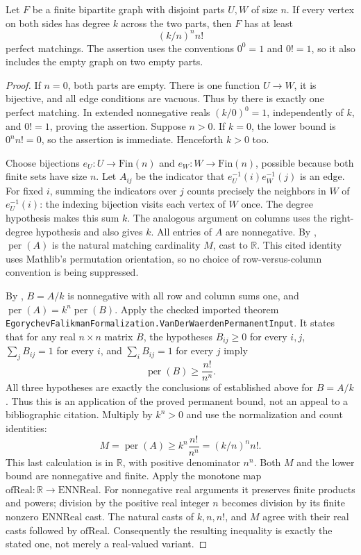 \begin{lemma}
Let $F$ be a finite bipartite graph with disjoint parts $U,W$ of size $n$.
If every vertex on both sides has degree $k$ across the two parts, then $F$
has at least
\[
 (k/n)^n n!
\]
perfect matchings.  The assertion uses the conventions $0^0=1$ and
$0!=1$, so it also includes the empty graph on two empty parts.
\end{lemma}
\begin{proof}
If $n=0$, both parts are empty. There is one function $U\to W$,
it is bijective, and all edge conditions are vacuous. Thus by
 there is exactly one perfect matching.
In extended nonnegative reals $(k/0)^0=1$, independently of $k$,
and $0!=1$, proving the assertion. Suppose $n>0$.
If $k=0$, the lower bound is $0^n n!=0$, so the assertion is immediate.
Henceforth $k>0$ too.

Choose bijections $e_U:U\to\mathrm{Fin}(n)$ and
$e_W:W\to\mathrm{Fin}(n)$, possible because both finite sets have size $n$.
Let $A_{ij}$ be the indicator that $e_U^{-1}(i)e_W^{-1}(j)$ is an edge.
For fixed $i$, summing the indicators over $j$ counts precisely the
neighbors in $W$ of $e_U^{-1}(i)$: the indexing bijection visits each vertex
of $W$ once. The degree hypothesis makes this sum $k$. The analogous
argument on columns uses the right-degree hypothesis and also gives $k$.
All entries of $A$ are nonnegative. By
, $\operatorname{per}(A)$ is
the natural matching cardinality $M$, cast to $\mathbb R$.
This cited identity uses Mathlib's permutation orientation, so no choice
of row-versus-column convention is being suppressed.

By , $B=A/k$ is nonnegative with
all row and column sums one, and
$\operatorname{per}(A)=k^n\operatorname{per}(B)$.
Apply the checked imported theorem
\texttt{EgorychevFalikmanFormalization.VanDerWaerdenPermanentInput}.
It states that for any real $n\times n$ matrix $B$, the hypotheses
$B_{ij}\ge0$ for every $i,j$, $\sum_jB_{ij}=1$ for every $i$, and
$\sum_iB_{ij}=1$ for every $j$ imply
\[
 \operatorname{per}(B)\ge\frac{n!}{n^n}.
\]
All three hypotheses are exactly the conclusions of
 established above for $B=A/k$.
Thus this is an application of the proved permanent bound, not an appeal
to a bibliographic citation.
Multiply by $k^n>0$ and use the normalization and count identities:
\[
 M=\operatorname{per}(A)\ge k^n\frac{n!}{n^n}
   =(k/n)^n n!.
\]
This last calculation is in $\mathbb R$, with positive denominator $n^n$.
Both $M$ and the lower bound are nonnegative and finite. Apply the monotone
map $\mathrm{ofReal}:\mathbb R\to\mathrm{ENNReal}$. For nonnegative real
arguments it preserves finite products and powers; division by the
positive real integer $n$ becomes division by its finite nonzero
$\mathrm{ENNReal}$ cast. The natural casts of $k,n,n!$, and $M$ agree with
their real casts followed by $\mathrm{ofReal}$. Consequently the resulting
inequality is exactly the stated one, not merely a real-valued variant.
\end{proof}
